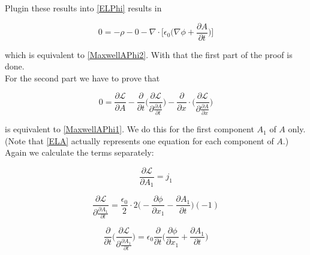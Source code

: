\documentclass{article}
\begin{document}
Plugin these results into \ref{ELPhi} results in

\begin{equation}
0 = -\rho - 0 -\nabla \cdot \bigg[\epsilon_0 \bigg(\nabla \phi + \frac{\partial A}{\partial t} \bigg)\bigg]
\end{equation}

which is equivalent to \ref{MaxwellAPhi2}. With that the first part of the proof is done. \\

For the second part we have to prove that 

\begin{equation} \label{ELA}
0 = \frac{\partial \mathcal{L}}{\partial A}
-\frac{\partial}{\partial t} \bigg( \frac{\partial \mathcal{L}}{\partial \frac{\partial A}{\partial t}} \bigg) 
-\frac{\partial}{\partial x} \cdot \bigg( \frac{\partial \mathcal{L}}{\partial \frac{\partial A}{\partial x}} \bigg) 
\end{equation}

is equivalent to \ref{MaxwellAPhi1}. We do this for the first component $A_1$ of $A$ only. (Note that \ref{ELA} actually represents one equation for each component of $A$.) Again we calculate the terms separately:

\begin{equation}
\frac{\partial \mathcal{L}}{\partial A_1} = j_1
\end{equation}

\begin{equation}
\frac{\partial \mathcal{L}}{\partial \frac{\partial A_1}{\partial t} } 
= \frac{\epsilon_0}{2} \cdot 2 \bigg(-\frac{\partial \phi}{\partial x_1} - \frac{\partial A_1}{\partial t}\bigg) (-1)
\end{equation}

\begin{equation}
\frac{\partial}{\partial t} \bigg(\frac{\partial \mathcal{L}}{\partial \frac{\partial A_1}{\partial t} } \bigg)
= \epsilon_0 \frac{\partial}{\partial t} \bigg(\frac{\partial \phi}{\partial x_1} + \frac{\partial A_1}{\partial t}\bigg)
\end{equation}
\end{document}
